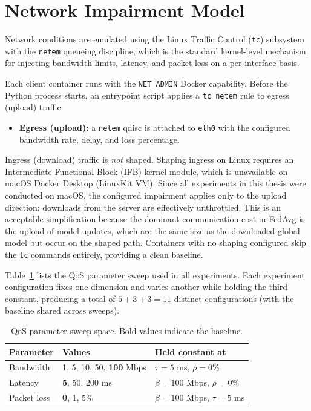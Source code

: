\documentclass[12pt,a4paper]{report}
\begin{document}
\section{Network Impairment Model}

Network conditions are emulated using the Linux Traffic Control (\texttt{tc})
subsystem with the \texttt{netem} queueing discipline, which is the standard
kernel-level mechanism for injecting bandwidth limits, latency, and packet loss
on a per-interface basis.

Each client container runs with the \texttt{NET\_ADMIN} Docker capability.
Before the Python process starts, an entrypoint script applies a \texttt{tc netem}
rule to egress (upload) traffic:

\begin{itemize}
  \item \textbf{Egress (upload):} a \texttt{netem} qdisc is attached to
        \texttt{eth0} with the configured bandwidth rate, delay, and loss
        percentage.
\end{itemize}

Ingress (download) traffic is \emph{not} shaped.  Shaping ingress on Linux
requires an Intermediate Functional Block (IFB) kernel module, which is
unavailable on macOS Docker Desktop (LinuxKit VM).  Since all experiments in
this thesis were conducted on macOS, the configured impairment applies only to
the upload direction; downloads from the server are effectively unthrottled.
This is an acceptable simplification because the dominant communication cost in
FedAvg is the upload of model updates, which are the same size as the
downloaded global model but occur on the shaped path.  Containers with no
shaping configured skip the \texttt{tc} commands entirely, providing a clean
baseline.

Table~\ref{tab:sweep} lists the QoS parameter sweep used in all experiments.
Each experiment configuration fixes one dimension and varies another while
holding the third constant, producing a total of $5 + 3 + 3 = 11$ distinct
configurations (with the baseline shared across sweeps).

\begin{table}[H]
\centering
\caption{QoS parameter sweep space.  Bold values indicate the baseline.}
\label{tab:sweep}
\begin{tabular}{lll}
\toprule
Parameter & Values & Held constant at \\
\midrule
Bandwidth & 1, 5, 10, 50, \textbf{100} Mbps & $\tau = 5$ ms, $\rho = 0\%$ \\
Latency   & \textbf{5}, 50, 200 ms           & $\beta = 100$ Mbps, $\rho = 0\%$ \\
Packet loss & \textbf{0}, 1, 5\%              & $\beta = 100$ Mbps, $\tau = 5$ ms \\
\bottomrule
\end{tabular}
\end{table}
\end{document}
